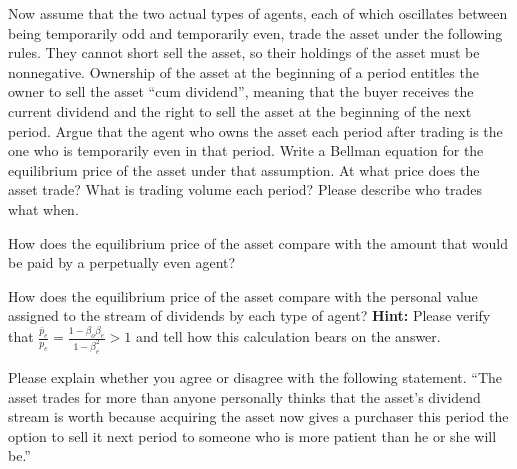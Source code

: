 \medskip
{}  Now assume that the  two actual types of agents, each of which oscillates between being temporarily odd and temporarily even,  trade the asset
under the following rules. They cannot short sell the asset, so their holdings of the asset must be nonnegative.  Ownership of the asset at the beginning of a period entitles the owner to sell the asset ``cum dividend'', meaning that the buyer
receives the current dividend and the right to sell the asset at the beginning of the next period.
Argue  that the agent who owns  the asset each period after trading  is the one who is temporarily even in that period.  Write a Bellman equation for the equilibrium price
of the asset under that assumption.
At what price does the asset trade? What is trading volume each period?  Please describe who trades what when. 

\medskip
{}  How does the equilibrium price of the asset compare with the amount that would be paid by a perpetually even agent?

\medskip
{} How does the equilibrium price of the asset compare with the personal value  assigned  to the stream of dividends  by each type of agent?
{\bf Hint:} Please verify  that ${\frac{\bar p_e}{p_e}} = {\frac{ 1- \beta_o \beta_e}{1 - \beta_e^2}} >1$ and tell how this calculation bears on the answer.

\medskip
{}  Please explain whether you agree or disagree with the following statement.  ``The asset trades for more than anyone personally thinks that the asset's dividend stream is worth because
acquiring the asset now gives a purchaser this period  the option to sell it next period to someone who is more patient than  he or she will be.''






\bye






\bye
